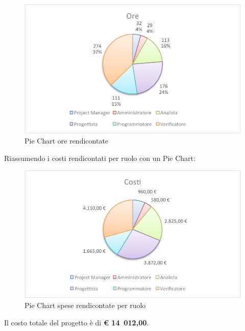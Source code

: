 			\begin{figure}[H]\centering
				\includegraphics[width=\textwidth]{PianoDiProgetto/Pics/ChartTotOreRendic.pdf}
				\caption{Pie Chart ore rendicontate}
			\end{figure}
			Riassumendo i costi rendicontati per ruolo con un Pie Chart:
			\begin{figure}[H]\centering
				\includegraphics[width=\textwidth]{PianoDiProgetto/Pics/ChartTotCostiRendic.pdf}
				\caption{Pie Chart spese rendicontate per ruolo}
			\end{figure}
		Il costo totale del progetto è di \textbf{\euro{} 14~012,00}.